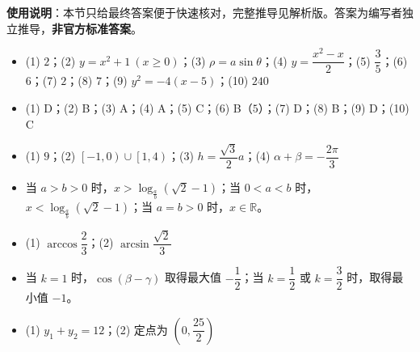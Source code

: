 
\begin{gknotice}
\textbf{使用说明}：本节只给最终答案便于快速核对，完整推导见解析版。答案为编写者独立推导，\textbf{非官方标准答案}。
\end{gknotice}

\begin{itemize}[leftmargin=2.6em]
  \item[\textbf{1.}] (1) $2$；(2) $y=x^2+1\ (x\ge0)$；(3) $\rho=a\sin\theta$；(4) $y=\dfrac{x^2-x}{2}$；(5) $\dfrac35$；(6) $6$；(7) $2$；(8) $7$；(9) $y^2=-4(x-5)$；(10) $240$
  \item[\textbf{2.}] (1) D；(2) B；(3) A；(4) A；(5) C；(6) B（$5$）；(7) D；(8) B；(9) D；(10) C
  \item[\textbf{3.}] (1) $9$；(2) $\left[-1,0\right)\cup\left[1,4\right)$；(3) $h=\dfrac{\sqrt3}{2}a$；(4) $\alpha+\beta=-\dfrac{2\pi}{3}$
  \item[\textbf{4.}] 当 $a>b>0$ 时，$x>\log_{\frac ab}(\sqrt2-1)$；当 $0<a<b$ 时，$x<\log_{\frac ab}(\sqrt2-1)$；当 $a=b>0$ 时，$x\in\mathbb R$。
  \item[\textbf{5.}] (1) $\arccos\dfrac23$；(2) $\arcsin\dfrac{\sqrt2}{3}$
  \item[\textbf{6.}] 当 $k=1$ 时，$\cos(\beta-\gamma)$ 取得最大值 $-\dfrac12$；当 $k=\dfrac12$ 或 $k=\dfrac32$ 时，取得最小值 $-1$。
  \item[\textbf{7.}] (1) $y_1+y_2=12$；(2) 定点为 $\left(0,\dfrac{25}{2}\right)$
\end{itemize}
